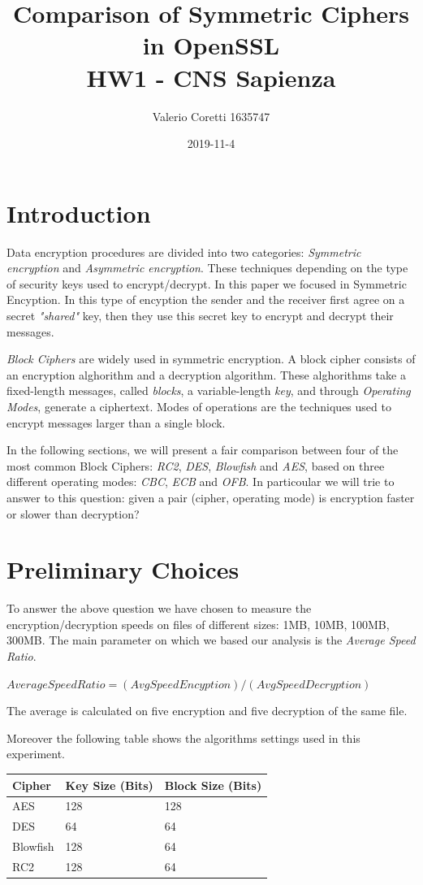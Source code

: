 \documentclass[11pt]{article}
\title{{\bf Comparison of Symmetric Ciphers in OpenSSL} \\ \bigskip \large HW1 - CNS Sapienza}
\date{2019-11-4}
\author{Valerio Coretti 1635747}
\begin{document}
\maketitle

\section{Introduction}
Data encryption procedures are divided into two categories: {\em Symmetric encryption} and {\em Asymmetric encryption}. These techniques 
depending on the type of security keys used to encrypt/decrypt. In this paper we focused in Symmetric Encyption. In this type of encyption 
the sender and the receiver first agree on a secret {\em "shared"} key, then they use this secret key to encrypt and decrypt their messages.

{\em Block Ciphers} are widely used in symmetric encryption. A block cipher consists of an encryption alghorithm and a decryption algorithm. 
These alghorithms take a fixed-length messages, called {\em blocks}, a variable-length {\em key}, and through {\em Operating Modes}, generate
a ciphertext. Modes of operations are the techniques used to encrypt messages larger than a single block.

In the following sections, we will present a fair comparison between four of the most common Block Ciphers: 
{\em RC2}, {\em DES}, {\em Blowfish} and {\em AES}, based on three different operating modes: {\em CBC}, {\em ECB} and {\em OFB}.
In particoular we will trie to answer to this question: given a pair (cipher, operating mode) is encryption faster or slower than decryption?

\section{Preliminary Choices}
To answer the above question we have chosen to measure the encryption/decryption speeds on files of different sizes: 1MB, 10MB, 100MB, 300MB.
The main parameter on which we based our analysis is the {\em Average Speed Ratio}.

$ Average Speed Ratio = (AvgSpeedEncyption)/(AvgSpeedDecryption) $

The average is calculated on five encryption and five decryption of the same file.

Moreover the following table shows the algorithms settings used in this experiment.

\bigskip
\begin{tabular}{ | l | l | l | }
        \hline
        \textbf{Cipher} & \textbf{Key Size (Bits)} & \textbf{Block Size (Bits)} \\ \hline
    AES & 128 & 128  \\ \hline
    DES & 64 & 64 \\ \hline
    Blowfish & 128 & 64 \\ \hline
    RC2 & 128 & 64 \\ \hline
\end{tabular}
\bigskip
\end{document}
